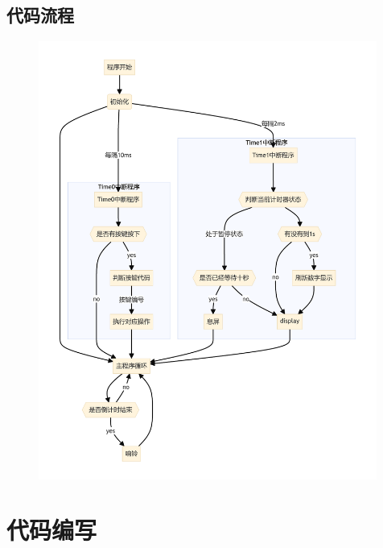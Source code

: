 \documentclass{article}
\begin{document}
\subsection{代码流程}
\begin{figure}[H]
    \centering
    \includegraphics*[width=0.99\textwidth]{assets/flowchart.pdf}
\end{figure}
\newpage
\section{代码编写}
\end{document}
